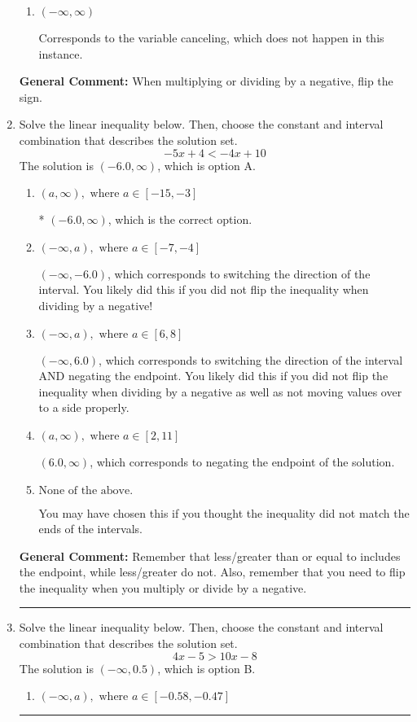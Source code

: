 \documentclass{extbook}[14pt]
\newcommand{\litem}[1]{\item #1

\rule{\textwidth}{0.4pt}}
\begin{document}
\begin{enumerate}
{\begin{enumerate}[label=\Alph*.]
 * Correct option.
\item \( (-\infty, \infty) \)

Corresponds to the variable canceling, which does not happen in this instance.
\end{enumerate}

\textbf{General Comment:} When multiplying or dividing by a negative, flip the sign.
}
\litem{
Solve the linear inequality below. Then, choose the constant and interval combination that describes the solution set.
\[ -5x + 4 < -4x + 10 \]The solution is \( (-6.0, \infty) \), which is option A.\begin{enumerate}[label=\Alph*.]
\item \( (a, \infty), \text{ where } a \in [-15, -3] \)

* $(-6.0, \infty)$, which is the correct option.
\item \( (-\infty, a), \text{ where } a \in [-7, -4] \)

 $(-\infty, -6.0)$, which corresponds to switching the direction of the interval. You likely did this if you did not flip the inequality when dividing by a negative!
\item \( (-\infty, a), \text{ where } a \in [6, 8] \)

 $(-\infty, 6.0)$, which corresponds to switching the direction of the interval AND negating the endpoint. You likely did this if you did not flip the inequality when dividing by a negative as well as not moving values over to a side properly.
\item \( (a, \infty), \text{ where } a \in [2, 11] \)

 $(6.0, \infty)$, which corresponds to negating the endpoint of the solution.
\item \( \text{None of the above}. \)

You may have chosen this if you thought the inequality did not match the ends of the intervals.
\end{enumerate}

\textbf{General Comment:} Remember that less/greater than or equal to includes the endpoint, while less/greater do not. Also, remember that you need to flip the inequality when you multiply or divide by a negative.
}
\litem{
Solve the linear inequality below. Then, choose the constant and interval combination that describes the solution set.
\[ 4x -5 > 10x -8 \]The solution is \( (-\infty, 0.5) \), which is option B.\begin{enumerate}[label=\Alph*.]
\item \( (-\infty, a), \text{ where } a \in [-0.58, -0.47] \)


\end{enumerate}}
\end{enumerate}
\end{document}
